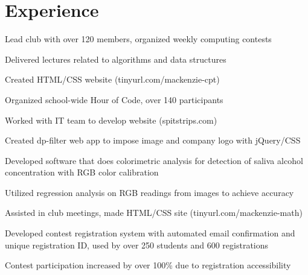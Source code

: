 \documentclass[]{deedy-resume-openfont}
\begin{document}
\hfill
\begin{minipage}[t]{0.66\textwidth} 


\section{Experience}

\vspace{\topsep} %
\begin{tightemize}
\item Lead club with over 120 members, organized weekly computing contests
\item Delivered lectures related to algorithms and data structures
\item Created HTML/CSS website (tinyurl.com/mackenzie-cpt)
\item Organized school-wide Hour of Code, over 140 participants
\end{tightemize}
\sectionsep

\begin{tightemize}
\item Worked with IT team to develop website (spitstrips.com)
\item Created dp-filter web app to impose image and company logo with jQuery/CSS
\item Developed software that does colorimetric analysis for detection of saliva alcohol concentration with RGB color calibration
\item Utilized regression analysis on RGB readings from images to achieve accuracy
\end{tightemize}
\sectionsep

\begin{tightemize}
\item Assisted in club meetings, made HTML/CSS site (tinyurl.com/mackenzie-math)
\item Developed contest registration system with automated email confirmation and unique registration ID, used by over 250 students and 600 registrations 
\item Contest participation increased by over 100\% due to registration accessibility
\end{tightemize}
\sectionsep


\end{minipage}
\end{document}
